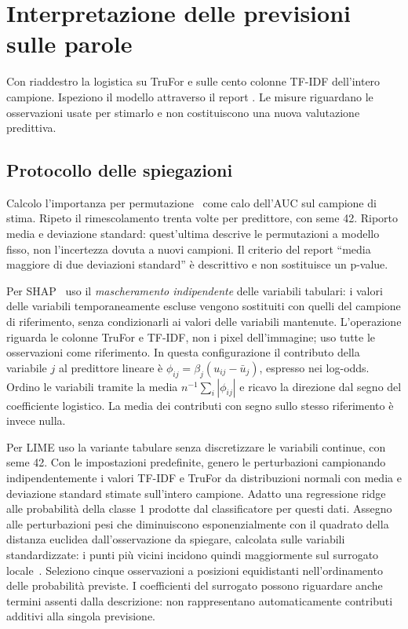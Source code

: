 \section{Interpretazione delle previsioni sulle parole}
\label{sec:associazione-spiegazioni}

Con  riaddestro la logistica su TruFor e sulle cento colonne TF-IDF dell'intero campione. Ispeziono il modello attraverso il report . Le misure riguardano le osservazioni usate per stimarlo e non costituiscono una nuova valutazione predittiva.

\subsection{Protocollo delle spiegazioni}
\label{subsec:metodi-classificazione-spiegazioni}

Calcolo l'importanza per permutazione~\cite{JMLR:v20:18-760} come calo dell'AUC sul campione di stima. Ripeto il rimescolamento trenta volte per predittore, con seme 42. Riporto media e deviazione standard: quest'ultima descrive le permutazioni a modello fisso, non l'incertezza dovuta a nuovi campioni. Il criterio del report ``media maggiore di due deviazioni standard'' è descrittivo e non sostituisce un p-value.

Per SHAP~\cite{NIPS2017_8a20a862} uso il \emph{mascheramento indipendente} delle variabili tabulari: i valori delle variabili temporaneamente escluse vengono sostituiti con quelli del campione di riferimento, senza condizionarli ai valori delle variabili mantenute. L'operazione riguarda le colonne TruFor e TF-IDF, non i pixel dell'immagine; uso tutte le osservazioni come riferimento. In questa configurazione il contributo della variabile $j$ al predittore lineare è $\phi_{ij}=\beta_j(u_{ij}-\bar u_j)$, espresso nei log-odds. Ordino le variabili tramite la media $n^{-1}\sum_i|\phi_{ij}|$ e ricavo la direzione dal segno del coefficiente logistico. La media dei contributi con segno sullo stesso riferimento è invece nulla.

Per LIME uso la variante tabulare senza discretizzare le variabili continue, con seme 42. Con le impostazioni predefinite, genero le perturbazioni campionando indipendentemente i valori TF-IDF e TruFor da distribuzioni normali con media e deviazione standard stimate sull'intero campione. Adatto una regressione ridge alle probabilità della classe 1 prodotte dal classificatore per questi dati. Assegno alle perturbazioni pesi che diminuiscono esponenzialmente con il quadrato della distanza euclidea dall'osservazione da spiegare, calcolata sulle variabili standardizzate: i punti più vicini incidono quindi maggiormente sul surrogato locale~\cite{ribeiro2016whyitrustyou}. Seleziono cinque osservazioni a posizioni equidistanti nell'ordinamento delle probabilità previste. I coefficienti del surrogato possono riguardare anche termini assenti dalla descrizione: non rappresentano automaticamente contributi additivi alla singola previsione.

